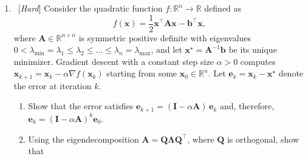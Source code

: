 \documentclass[letterpaper]{article}
\newcommand{\Real}{\mathbb{R}}
\newcommand{\tr}{^\top}
\newcommand{\opt}{^\star}
\begin{document}
\begin{enumerate}
\begin{enumerate}
\[    \]
    where the rows of $\bm{A} \in \Real^{m\times n}$ are $\bm{a}_i\tr$, $\bm{y} = (y_1, \dots, y_m)\tr$, and $\sigma$ is applied to each element of $\bm{A}\bm{x}$.
  \item Consider the following eight data points $(t_i, y_i)$:
    \[
      \begin{array}{c|cccccccc}
        t_i & 0.5 & 1.0 & 1.5 & 2.0 & 2.5 & 3.0 & 3.5 & 4.0 \\ \hline
        y_i & 0 & 0 & 0 & 1 & 0 & 1 & 1 & 1
      \end{array}
    \]
    Fit the logistic regression model $\Pr[y = 1 \mid t] = \sigma(x_1 + x_2 t)$ with an intercept $x_1$ and slope $x_2$. Construct the matrix $\bm{A}$ and implement gradient descent \emph{from scratch} using the gradient from part (b); do \textbf{not} use a logistic regression library (such as \texttt{GLM.jl}, \texttt{scikit-learn}, or R's \texttt{glm}). Report the step size, the number of iterations, and the coefficients $\bm{x}\opt = (x_1\opt, x_2\opt)\tr$ you obtain, and plot the loss $L(\bm{x}_k)$ against the iteration number $k$.
  \item Plot the eight data points together with the predicted probability $\sigma(x_1\opt + x_2\opt t)$ as a function of $t \in [0, 4.5]$. At what value of $t$ does the model predict $\Pr[y = 1 \mid t] = 0.5$?
  \end{enumerate}
\item \ [\emph{Hard}] \label{prob:gd-quadratic} Consider the quadratic function $f\colon \Real^n \to \Real$ defined as
  \[
    f(\bm{x}) = \frac{1}{2} \bm{x}\tr \bm{A} \bm{x} - \bm{b}\tr \bm{x},
  \]
  where $\bm{A} \in \Real^{n\times n}$ is symmetric positive definite with eigenvalues $0 < \lambda_{\min} = \lambda_1 \le \lambda_2 \le \dots \le \lambda_n = \lambda_{\max}$, and let $\bm{x}\opt = \bm{A}^{-1}\bm{b}$ be its unique minimizer. Gradient descent with a constant step size $\alpha > 0$ computes $\bm{x}_{k+1} = \bm{x}_k - \alpha \nabla f(\bm{x}_k)$ starting from some $\bm{x}_0 \in \Real^n$. Let $\bm{e}_k = \bm{x}_k - \bm{x}\opt$ denote the error at iteration $k$.
  \begin{enumerate}
  \item Show that the error satisfies $\bm{e}_{k+1} = (\bm{I} - \alpha \bm{A})\, \bm{e}_k$ and, therefore, $\bm{e}_k = (\bm{I} - \alpha \bm{A})^k \bm{e}_0$.
  \item Using the eigendecomposition $\bm{A} = \bm{Q} \bm{\Lambda} \bm{Q}\tr$, where $\bm{Q}$ is orthogonal, show that

\end{enumerate}
\end{enumerate}
\end{document}
